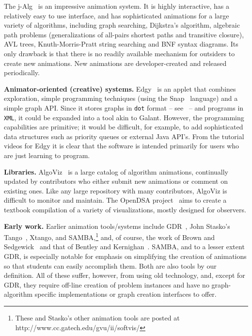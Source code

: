 The j-Alg~\cite{j-Algo} is an impressive animation system.
It is highly interactive, has a relatively easy to use interface, and has sophisticated animations for a large variety of algorithms,
including graph searching, Dijkstra's algorithm,
algebraic path problems (generalizations of all-pairs shortest paths and transitive closure), AVL trees, Knuth-Morris-Pratt string searching and BNF syntax diagrams.
Its only drawback is that there is no readily available mechanism
for outsiders to create new animations.
New animations are developer-created and released periodically.

\textbf{Animator-oriented (creative) systems.}
Edgy~\cite{Edgy} is an applet that combines exploration, simple programming techniques
(using the Snap~\cite{Snap} language) and a simple graph API.
Since it stores graphs in \texttt{dot} format -- see~\cite{GraphViz} --
and programs in \texttt{XML},
it could be expanded into a tool akin to Galant.
However, the programming capabilities are primitive;
it would be difficult, for example, to add sophisticated data structures such as
priority queues or external Java API's.
From the tutorial videos for Edgy it is clear that the software is intended
primarily
for users who are just learning to program.

\textbf{Libraries.}
AlgoViz~\cite{AlgoViz}
is a large catalog of algorithm animations, continually updated by
contributors who either submit new animations or comment on existing ones.
Like any large repository with many contributors, AlgoViz is difficult to
monitor and
maintain.
The OpenDSA project~\cite{%
2012-SIGCSE-Fouh,2011-Koli-Shaffer,2011-ProgramVisualization-Shaffer%
}
aims to create a textbook compilation of a variety of
visualizations, mostly designed for observers.

\textbf{Early work.}
Earlier animation tools/systems include GDR~\cite{1992-CSDM-Stallmann}, John Stasko's
Tango~\cite{1990-Computer-Stasko}, Xtango,
and SAMBA,\footnote{
These and Stasko's other animation tools are posted at
http://www.cc.gatech.edu/gvu/ii/softvis/
} and, of course,
the work of
Brown and Sedgewick~\cite{1988-Computer-Brown,1985-IEEE_Software-Brown}
and that of Bentley and Kernighan~\cite{1987-Animation-Bentley}.
SAMBA, and to a lesser extent GDR, is especially notable for emphasis on simplifying the creation of
animations so that students can easily accomplish them.
Both are also tools by our definition.
All of these suffer, however, from using old technology,
and, except for GDR,
they require off-line creation
of problem instances and have no graph-algorithm specific implementations
or graph creation interfaces to offer.


